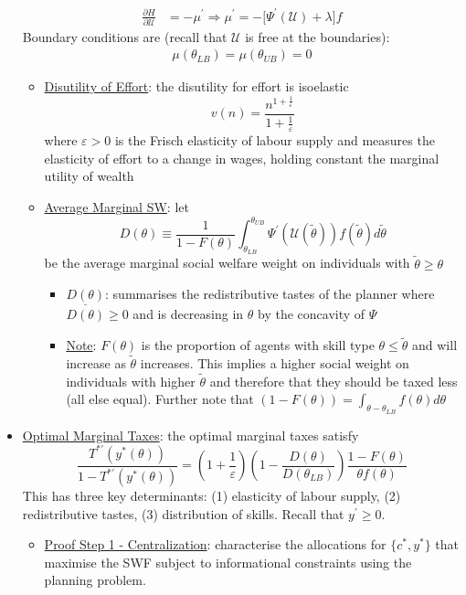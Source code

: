 \documentclass{article}
\begin{document}
\begin{itemize}
\begin{align*}
        \frac{\partial H}{\partial \mathcal{U}} &= -\mu^{'} \Rightarrow \mu^{'} = - \big[\Psi^{'}(\mathcal{U}) + \lambda \big] f
    \end{align*}
    Boundary conditions are (recall that $\mathcal{U}$ is free at the boundaries):
    \begin{gather*}
        \mu(\theta_{LB}) = \mu(\theta_{UB}) = 0
    \end{gather*}
    \begin{itemize}
        \item  \underline{Disutility of Effort}: the disutility for effort is isoelastic $$v(n) = \frac{n^{1+\tfrac{1}{\varepsilon}}}{1 + \tfrac{1}{\varepsilon}}$$ where $\varepsilon > 0$ is the Frisch elasticity of labour supply and measures the elasticity of effort to a change in wages, holding constant the marginal utility of wealth
        \item  \underline{Average Marginal SW}: let $$D(\theta) \equiv \frac{1}{1 - F(\theta)} \int_{\theta_{LB}}^{\theta_{UB}} \Psi^{'} (\mathcal{U}(\widetilde{\theta})) f (\widetilde{\theta}) d \widetilde{\theta} $$ be the average marginal social welfare weight on individuals with $\widetilde{\theta} \geq \theta$
        \begin{itemize}
            \item $\underline{D(\theta)}$: summarises the redistributive tastes of the planner where $D(\theta) \geq 0$ and is decreasing in $\theta$ by the concavity of $\Psi$
            \item \underline{Note}: $F(\theta)$ is the proportion of agents with skill type $\theta \leq \widetilde{\theta}$ and will increase as $\widetilde{\theta}$ increases. This implies a higher social weight on individuals with higher $\widetilde{\theta}$ and therefore that they should be taxed less (all else equal). Further note that $(1 - F(\theta)) = \int_{\theta - \theta_{LB}} f(\theta) d \theta$
        \end{itemize}
    \end{itemize}
    \item \underline{Optimal Marginal Taxes}: the optimal marginal taxes satisfy $$\frac{T^{*'}(y^{*}(\theta))}{1 - T^{*'}(y^{*}(\theta))} = (1 + \frac{1}{\varepsilon})(1 - \frac{D(\theta)}{D(\theta_{LB})})\frac{1 - F(\theta)}{\theta f(\theta)}$$ This has three key determinants: (1) elasticity of labour supply, (2) redistributive tastes, (3) distribution of skills. Recall that $y^{'} \geq 0$.
    \begin{itemize}
        \item  \underline{Proof Step 1 - Centralization}: characterise the allocations for $\{ c^{*}, y^{*} \}$ that maximise the SWF subject to informational constraints using the planning problem. \\

\end{itemize}
\end{itemize}
\end{document}
